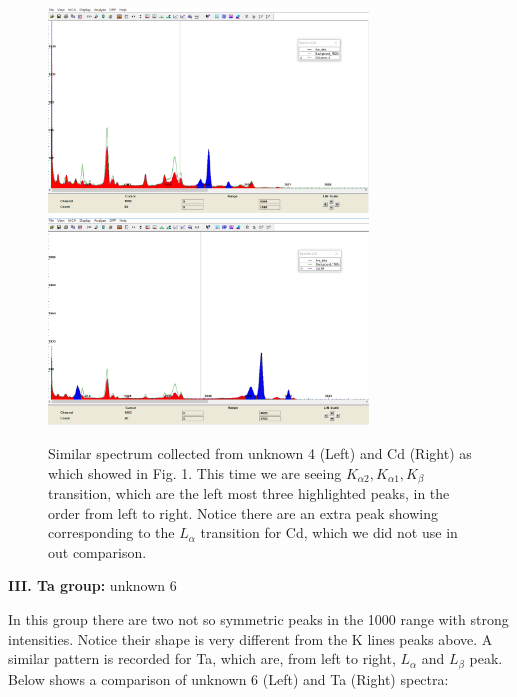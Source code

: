 \documentclass[12pt]{article}
\begin{document}
\begin{figure}[H]
\includegraphics[width=8.5cm]{U4}
\includegraphics[width=8.5cm]{Cd_48}
\label{Fig. 2}
\caption{Similar spectrum collected from unknown 4 (Left) and Cd (Right) as which showed in Fig. 1. This time we are seeing $K_{\alpha2}, K_{\alpha1}, K_{\beta}$ transition, which are the left most three highlighted peaks, in the order from left to right. Notice there are an extra peak showing corresponding to the $L_{\alpha}$ transition for Cd, which we did not use in out comparison.}
\end{figure}
\smallskip

\textbf{III. Ta group:} unknown 6

In this group there are two not so symmetric peaks in the 1000 range with strong intensities. Notice their shape is very different from the K lines peaks above. A similar pattern is recorded for Ta, which are, from left to right, $L_{\alpha}$ and $L_{\beta}$ peak. Below shows a comparison of unknown 6 (Left) and Ta (Right) spectra:
\end{document}
